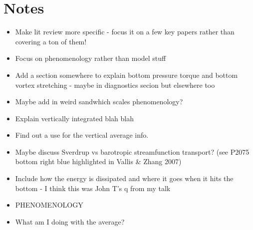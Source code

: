 \documentclass[..\EOYR.tex]{subfiles}
\begin{document}
\section*{Notes}
\begin{itemize}
	\item Make lit review more specific - focus it on a few key papers rather than covering a ton of them!
	\item Focus on phenomenology rather than model stuff
	\item Add a section somewhere to explain bottom pressure torque and bottom vortex stretching - maybe in diagnostics secion but elsewhere too
	\item Maybe add in weird sandwhich scales phenomenology?
	\item Explain vertically integrated blah blah
	\item Find out a use for the vertical average info.
	\item Maybe discuss Sverdrup vs barotropic streamfunction transport? (see P2075 bottom right blue highlighted in Vallis \& Zhang 2007)
	\item Include how the energy is dissipated and where it goes when it hits the bottom - I think this was John T's q from my talk
	\item PHENOMENOLOGY
	\item What am I doing with the average?
\end{itemize}
\end{document}
